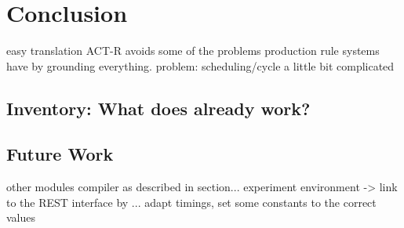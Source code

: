 \chapter{Conclusion}


easy translation
ACT-R avoids some of the problems production rule systems have by grounding everything.
problem: scheduling/cycle a little bit complicated



\section{Inventory: What does already work?}

\section{Future Work}

other modules
compiler as described in section...
experiment environment -> link to the REST interface by ...
adapt timings, set some constants to the correct values
